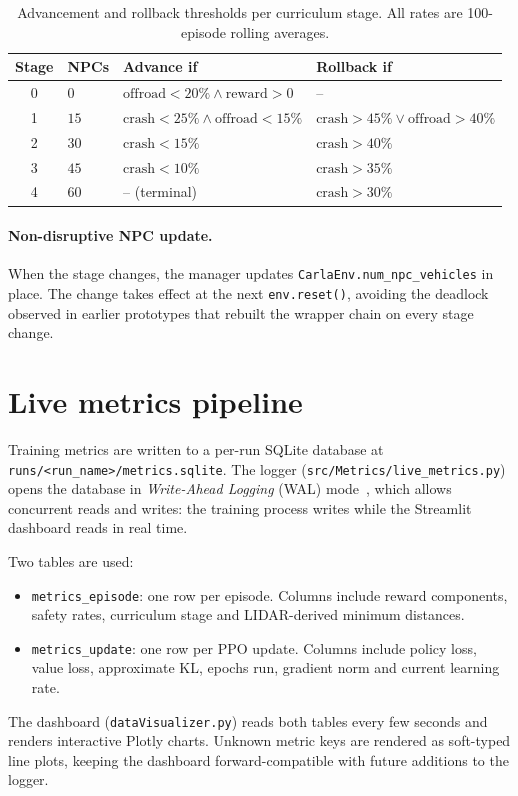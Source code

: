 \begin{table}[H]
  \centering
  \caption{Advancement and rollback thresholds per curriculum stage. All rates are 100-episode
           rolling averages.}
  \label{tab:curriculum-rules}
  \small
  \begin{tabular}{@{}clll@{}}
    \toprule
    \textbf{Stage} & \textbf{NPCs} & \textbf{Advance if} & \textbf{Rollback if} \\
    \midrule
    0 & \(0\)               & \(\text{offroad} < 20\% \wedge \text{reward} > 0\)
                            & -- \\
    1 & \(15\)              & \(\text{crash} < 25\% \wedge \text{offroad} < 15\%\)
                            & \(\text{crash} > 45\% \vee \text{offroad} > 40\%\) \\
    2 & \(30\)              & \(\text{crash} < 15\%\)
                            & \(\text{crash} > 40\%\) \\
    3 & \(45\)              & \(\text{crash} < 10\%\)
                            & \(\text{crash} > 35\%\) \\
    4 & \(60\)              & -- (terminal)
                            & \(\text{crash} > 30\%\) \\
    \bottomrule
  \end{tabular}
\end{table}

\paragraph{Non-disruptive NPC update.}
When the stage changes, the manager updates \texttt{CarlaEnv.num\_npc\_vehicles} in place. The
change takes effect at the next \texttt{env.reset()}, avoiding the deadlock observed in earlier
prototypes that rebuilt the wrapper chain on every stage change.

\section{Live metrics pipeline}\label{sec:design-metrics}

Training metrics are written to a per-run SQLite database at
\texttt{runs/\textless run\_name\textgreater/metrics.sqlite}. The logger
(\texttt{src/Metrics/live\_metrics.py}) opens the database in \emph{Write-Ahead Logging} (WAL)
mode~\cite{sqlitewal}, which allows concurrent reads and writes: the training process writes while
the Streamlit dashboard reads in real time.

Two tables are used:
\begin{itemize}
  \item \texttt{metrics\_episode}: one row per episode. Columns include reward components, safety
        rates, curriculum stage and LIDAR-derived minimum distances.
  \item \texttt{metrics\_update}: one row per PPO update. Columns include policy loss, value loss,
        approximate KL, epochs run, gradient norm and current learning rate.
\end{itemize}

The dashboard (\texttt{dataVisualizer.py}) reads both tables every few seconds and renders
interactive Plotly charts. Unknown metric keys are rendered as soft-typed line plots, keeping
the dashboard forward-compatible with future additions to the logger.

\clearpage
